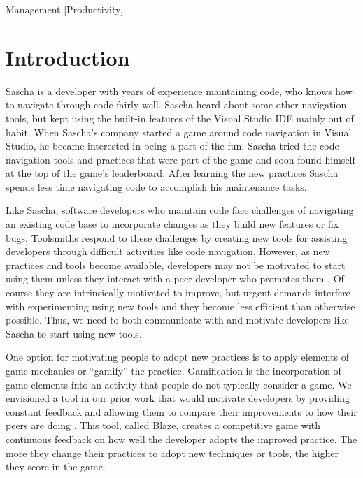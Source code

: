 \documentclass{sig-alternate}
\begin{document}
 {Management} [Productivity]



\section{Introduction}

Sascha is a developer with years of experience maintaining code, who knows how to navigate through code fairly well.  Sascha heard about some other navigation tools, but kept using the built-in features of the Visual Studio IDE mainly out of habit.  When Sascha's company started a game around code navigation in Visual Studio, he became interested in being a part of the fun.  Sascha tried the code navigation tools and practices that were part of the game and soon found himself at the top of the game's leaderboard.  After learning the new practices Sascha spends less time navigating code to accomplish his maintenance tasks.

Like Sascha, software developers who maintain code face challenges of navigating an existing code base to incorporate changes as they build new features or fix bugs.  Toolsmiths respond to these challenges by creating new tools for assisting developers through difficult activities like code navigation.  However, as new practices and tools become available, developers may not be motivated to start using them unless they interact with a peer developer who promotes them \cite{wbsnipes:Hill2011Peer}.    Of course they are intrinsically motivated to improve, but urgent demands interfere with experimenting using new tools and they become less efficient than otherwise possible.  Thus, we need to both communicate with and motivate developers like Sascha to start using new tools.  

One option for motivating people to adopt new practices is to apply elements of game mechanics or ``gamify'' the practice. Gamification is the incorporation of game elements into an activity that people do not typically consider a game\cite{2013Oxford}.  We envisioned a tool in our prior work that would motivate developers by providing constant feedback and allowing them to compare their improvements to how their peers are doing \cite{Snipes2013Towards}.  This tool, called Blaze, creates a competitive game with continuous feedback on how well the developer adopts the improved practice.  The more they change their practices to adopt new techniques or tools, the higher they score in the game. 
\end{document}
